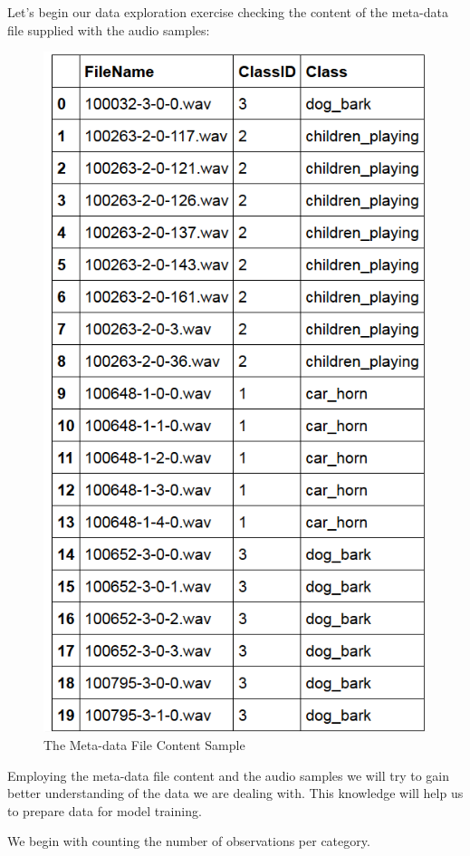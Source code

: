 Let's begin our data exploration exercise checking the content of the
meta-data file supplied with the audio samples:

\begin{Schunk}
\begin{figure}[H]

{\centering \includegraphics[width=0.5\linewidth]{../images/metadata20} 

}

\caption[The Meta-data File Content Sample]{The Meta-data File Content Sample}\label{fig:unnamed-chunk-2}
\end{figure}
\end{Schunk}

Employing the meta-data file content and the audio samples we will try
to gain better understanding of the data we are dealing with. This
knowledge will help us to prepare data for model training.

We begin with counting the number of observations per category.

